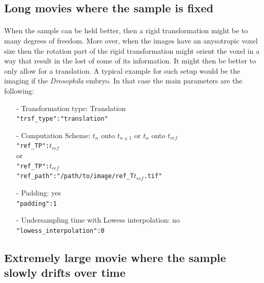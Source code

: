 \documentclass[10pt,a4paper]{article}
\begin{document}
\subsection{Long movies where the sample is fixed}
\paragraph{}When the sample can be held better, then a rigid transformation might be to many degrees of freedom. More over, when the images have an anysotropic voxel size then the rotation part of the rigid transformation might orient the voxel in a way that result in the lost of some of its information. It might then be better to only allow for a translation. A typical example for such setup would be the imaging if the \textit{Drosophila} embryo. In that case the main parameters are the following:
	\begin{itemize}
		\item[-] Transformation type: Translation\\
					\texttt{"trsf\_type":"translation"}
		\item[-] Computation Scheme: $t_n$ onto $t_{n\pm 1}$ or $t_n$ onto $t_{ref}$\\
					\texttt{"ref\_TP":$t_{ref}$}\\
					or\\
					\texttt{"ref\_TP":$t_{ref}$}\\
					\texttt{"ref\_path":"/path/to/image/ref\_T$t_{ref}$.tif"}
		\item[-] Padding: yes\\
					\texttt{"padding":1}
		\item[-] Undersampling time with Lowess interpolation: no\\
					\texttt{"lowess\_interpolation":0}
	\end{itemize}
\subsection{Extremely large movie where the sample slowly drifts over time}
\end{document}
